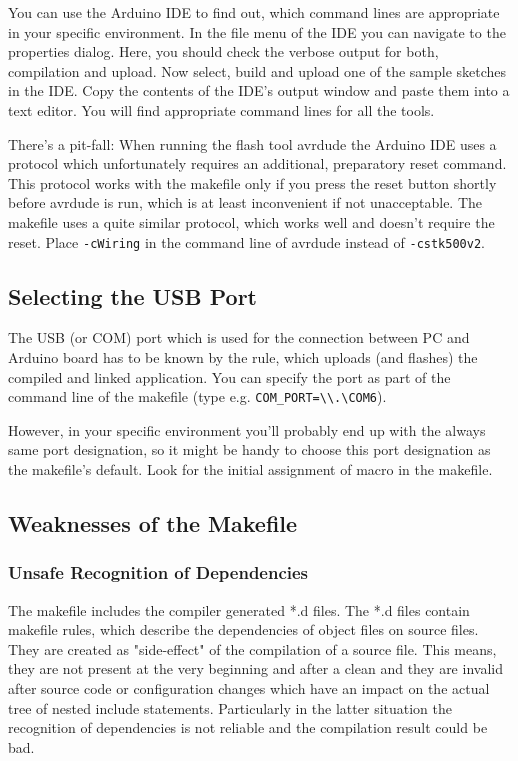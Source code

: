 You can use the Arduino IDE to find out, which command lines are
appropriate in your specific environment. In the file menu of the IDE you
can navigate to the properties dialog. Here, you should check the verbose
output for both, compilation and upload. Now select, build and upload
one of the sample sketches in the IDE. Copy the contents of the IDE's
output window and paste them into a text editor. You will find appropriate
command lines for all the tools.

There's a pit-fall: When running the flash tool avrdude the Arduino IDE
uses a protocol which unfortunately requires an additional, preparatory
reset command. This protocol works with the makefile only if you press the
reset button shortly before avrdude is run, which is at least inconvenient
if not unacceptable. The makefile uses a quite similar protocol, which
works well and doesn't require the reset. Place \verb+-cWiring+ in the
command line of avrdude instead of \verb+-cstk500v2+.


\subsection{Selecting the USB Port}

The USB (or COM) port which is used for the connection between PC and
Arduino board has to be known by the rule, which uploads (and flashes)
the compiled and linked application. You can specify the port as part of
the command line of the makefile (type e.g. \verb+COM_PORT=\\.\COM6+).

However, in your specific environment you'll probably end up with the
always same port designation, so it might be handy to choose this port
designation as the makefile's default. Look for the initial assignment of
macro  in the makefile.


\subsection{Weaknesses of the Makefile}

\subsubsection{Unsafe Recognition of Dependencies}

The makefile includes the compiler generated *.d files. The *.d files
contain makefile rules, which describe the dependencies of object files on
source files. They are created as "side-effect" of the compilation of a
source file. This means, they are not present at the very beginning and
after a clean and they are invalid after source code or configuration
changes which have an impact on the actual tree of nested include
statements. Particularly in the latter situation the recognition of
dependencies is not reliable and the compilation result could be bad.

